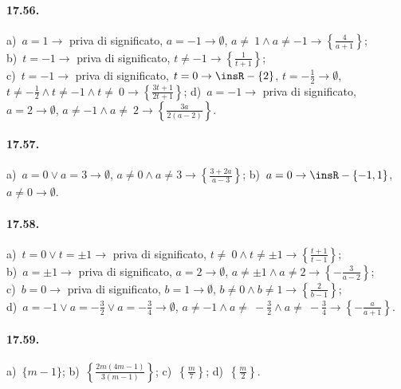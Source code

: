 \paragraph{17.56.}
a)~$a=1 \rightarrow$ priva di significato, $a=-1 \rightarrow \emptyset$, $a\neq~1\wedge a\neq -1 \rightarrow \left\{\frac{4}{a+1}\right\}$;
\protect\\ b)~$t=-1 \rightarrow$ priva di significato, $t\neq -1 \rightarrow \left\{\frac{1}{t+1}\right\}$;
\protect\\ c)~$t=-1 \rightarrow$ priva di significato, $t=0 \rightarrow \insR-\{2\}$, $t=-{\frac{1}{2}} \rightarrow \emptyset$, $t\neq -\frac{1}{2}\wedge t\neq -1\wedge t\neq~0 \rightarrow \left\{\frac{3t+1}{2t+1}\right\}$;
\quad d)~$a=-1 \rightarrow$ priva di significato, $a=2 \rightarrow \emptyset$, $a\neq -1\wedge a\neq~2 \rightarrow \left\{\frac{3a}{2(a-2)}\right\}$.

\paragraph{17.57.}
a)~$a=0 \vee a=3 \rightarrow \emptyset$, $a\neq 0 \wedge a\neq 3 \rightarrow \left\{\frac{3+2a}{a-3}\right\}$;
\quad b)~$a=0 \rightarrow \insR-\{-1,1\}$, $a\neq 0 \rightarrow \emptyset$.

\paragraph{17.58.}
a)~$t=0 \vee t=\pm 1 \rightarrow$ priva di significato, $t\neq~0\wedge t\neq \pm 1 \rightarrow \left\{\frac{t+1}{t-1}\right\}$;
\protect\\ b)~$a=\pm 1 \rightarrow$ priva di significato, $a=2 \rightarrow \emptyset$, $a\neq \pm 1 \wedge a\neq 2 \rightarrow \left\{-\frac{3}{a-2}\right\}$;
\protect\\ c)~$b=0 \rightarrow$ priva di significato, $b=1 \rightarrow \emptyset$, $b\neq 0\wedge b\neq 1 \rightarrow \left\{\frac{2}{b-1}\right\}$;
\protect\\ d)~$a=-1 \vee a=-\frac{3}{2}\vee a=-\frac{3}{4}\rightarrow \emptyset$, $a\neq -1\wedge a\neq~-\frac{3}{2}\wedge a\neq~-\frac{3}{4} \rightarrow \left\{-\frac{a}{a+1}\right\}$.

\paragraph{17.59.} %
a)~$\{m-1\}$; \quad b)~$\left\{\frac{2m(4m-1)}{3(m-1)}\right\}$; \quad c)~$\left\{\frac{m}{7}\right\}$;
\quad d)~$\left\{\frac{m}{2}\right\}$.

